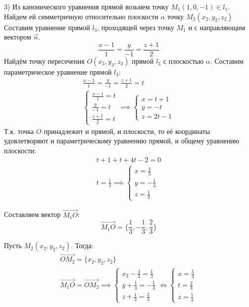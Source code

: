 \begin{eg}
  3) Из канонического уравнения прямой возьмем точку $M_1(1, 0, -1) \in l_1$. 
  Найдем ей симметричную относительно плоскости $\alpha$ точку $M_2(x_2, y_2, z_2)$
  Составим уравнение прямой $l_3$, проходящей через точку $M_1$ и с направляющим вектором $\vec{n}$. \[
    \frac{x - 1}{1} = \frac{y}{-1} = \frac{z + 1}{2}
  \] 
  Найдём точку пересечения $O(x_3, y_3, z_3)$ прямой $l_3$ с плоскостью $\alpha$. 
  Составим параметрическое уравнение прямой $l_3$:
  \begin{gather*}
    \frac{x - 1}{1} = \frac{y}{-1} = \frac{z + 1}{2} = t \\
    \begin{cases}
      \frac{x - 1}{1} = t \\
      \frac{y}{-1} = t \\
      \frac{z + 1}{2} = t
    \end{cases} \implies
    \begin{cases}
      x = t + 1 \\
      y = -t \\
      z = 2t - 1
    \end{cases}
  \end{gather*}
  Т.к. точка $O$ принадлежит и прямой, и плоскости, то её координаты удовлетворяют и параметрическому уравнению прямой, и общему уравнению плоскости:
  \begin{gather*}
    t + 1 + t + 4t - 2 = 0 \\
    t = \frac{1}{3} \implies \begin{cases}
      x = \frac{4}{3} \\
      y = -\frac{1}{3} \\
      z = \frac{1}{3}
    \end{cases}
  \end{gather*}

  Составляем вектор $\overrightarrow{M_1O}$: \[
  \overrightarrow{M_1O} = \{\frac{1}{3}, -\frac{1}{3}, \frac{2}{3}\} 
  \] 

  Пусть $M_2(x_2, y_2, z_2)$. Тогда:
  \begin{gather*}
    \overrightarrow{OM_2} = \{x_2, y_2, z_2\} \\
    \overrightarrow{M_1O} = \overrightarrow{OM_2} \implies \begin{cases}
      x_2 - \frac{4}{3} = \frac{1}{3} \\
      y + \frac{1}{3} = -\frac{1}{3} \\
      z + \frac{1}{3} = \frac{2}{3}
    \end{cases} \iff \begin{cases}
      x = \frac{5}{3} \\
      t = \frac{2}{3} \\
      z = \frac{1}{3}
    \end{cases}
  \end{gather*}


\end{eg}
